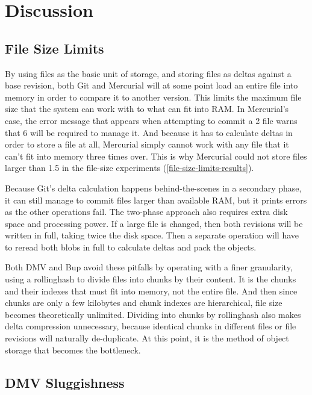 \section{Discussion}

\subsection{File Size Limits}

By using files as the basic unit of storage, and storing files as deltas against
a base revision, both Git and Mercurial will at some point load an entire file
into memory in order to compare it to another version. This limits the maximum
file size that the system can work with to what can fit into RAM. In Mercurial's
case, the error message that appears when attempting to \gls{commit} a
\SI{2}{\gib} file warns that \SI{6}{\gib} will be required to manage it. And
because it has to calculate deltas in order to store a file at all, Mercurial
simply cannot work with any file that it can't fit into memory three times over.
This is why Mercurial could not store files larger than \SI{1.5}{\gib} in the
file-size experiments (\autoref{file-size-limits-results}).

Because Git's delta calculation happens behind-the-scenes in a secondary phase,
it can still manage to \gls{commit} files larger than available RAM, but it
prints errors as the other operations fail. The two-phase approach also requires
extra disk space and processing power. If a large file is changed, then both
revisions will be written in full, taking twice the disk space. Then a separate
operation will have to reread both \glspl{blob} in full to calculate deltas and
pack the objects.

Both \gls{DMV} and Bup avoid these pitfalls by operating with a finer
granularity, using a \gls{rollinghash} to divide files into chunks by their
content. It is the chunks and their indexes that must fit into memory, not the
entire file. And then since chunks are only a few kilobytes and chunk indexes
are hierarchical, file size becomes theoretically unlimited. Dividing into
chunks by \gls{rollinghash} also makes delta compression unnecessary, because
identical chunks in different files or file revisions will naturally
de-duplicate. At this point, it is the method of object storage that becomes the
bottleneck.

\subsection{DMV Sluggishness}

